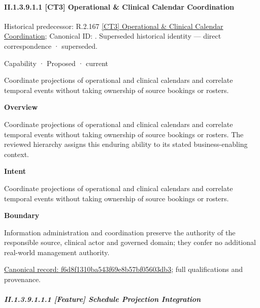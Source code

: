 \paragraph*{II.1.3.9.1.1 [CT3] Operational \& Clinical Calendar Coordination}
\label{navigation:II.1.3.9.1.1}

{\small Historical predecessor: R.2.167 \hyperref[element:c0f6e5f7f5a94d1580fa6e0e8b82c93a]{[CT3] Operational \& Clinical Calendar Coordination}; Canonical ID: \texttt{}. Superseded historical identity — direct correspondence · superseded.}\par
\label{element:f6d8f1310ba543f69e8b57bf05603db3}
{\small Capability · Proposed · current}\par

Coordinate projections of operational and clinical calendars and correlate temporal events without taking ownership of source bookings or rosters.



\textbf{Overview}



Coordinate projections of operational and clinical calendars and correlate temporal events without taking ownership of source bookings or rosters. The reviewed hierarchy assigns this enduring ability to its stated business-enabling context.



\textbf{Intent}



Coordinate projections of operational and clinical calendars and correlate temporal events without taking ownership of source bookings or rosters.



\textbf{Boundary}



Information administration and coordination preserve the authority of the responsible source, clinical actor and governed domain; they confer no additional real-world management authority.


{\footnotesize \href{../../../../../../../continuum/strategy/capability/f6d8f1310ba543f69e8b57bf05603db3.md}{Canonical record: f6d8f1310ba543f69e8b57bf05603db3}; full qualifications and provenance.}\par
\subparagraph*{II.1.3.9.1.1.1 [Feature] Schedule Projection Integration}
\label{navigation:II.1.3.9.1.1.1}

